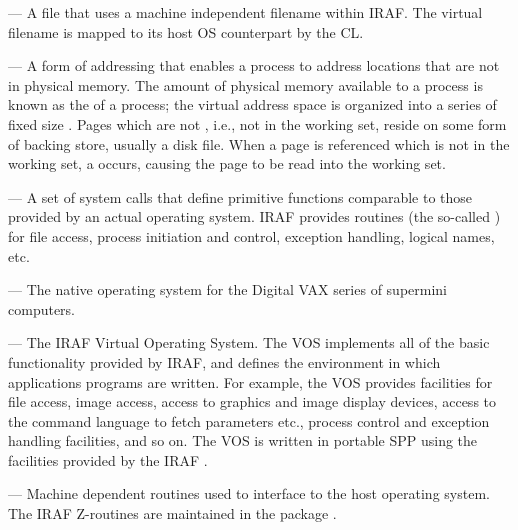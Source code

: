 \medskip \noindent {} --- A file that uses a machine
independent filename within IRAF. The virtual filename is mapped to its
host OS counterpart by the CL.

\medskip \noindent {} --- A form of addressing that
enables a process to address locations that are not in physical memory.
The amount of physical memory available to a process is known as the
 of a process; the virtual address space is organized
into a series of fixed size . Pages which are not
, i.e., not in the working set, reside on some form
of backing store, usually a disk file.  When a page is referenced which is not
in the working set, a  occurs, causing the page to be
read into the working set.

\medskip \noindent {} --- A set of system
calls that define primitive functions comparable
to those provided by an actual operating system.
IRAF provides routines (the so-called
) for file access, process initiation and control,
exception handling, logical names, etc.

\medskip \noindent {} --- The native operating system for the
Digital VAX series of supermini computers.

\medskip \noindent {} --- The IRAF Virtual Operating System.
The VOS implements all of the basic functionality provided by IRAF, and defines
the environment in which applications programs are written.  For example,
the VOS provides facilities for file access, image access, access to graphics
and image display devices, access to the command language to fetch parameters
etc., process control and exception handling facilities, and so on.  The VOS
is written in portable SPP using the facilities provided by the IRAF
.

\medskip \noindent {} --- Machine dependent routines used
to interface to the host operating system.  The IRAF Z-routines are maintained
in the package .

\onecolumn


